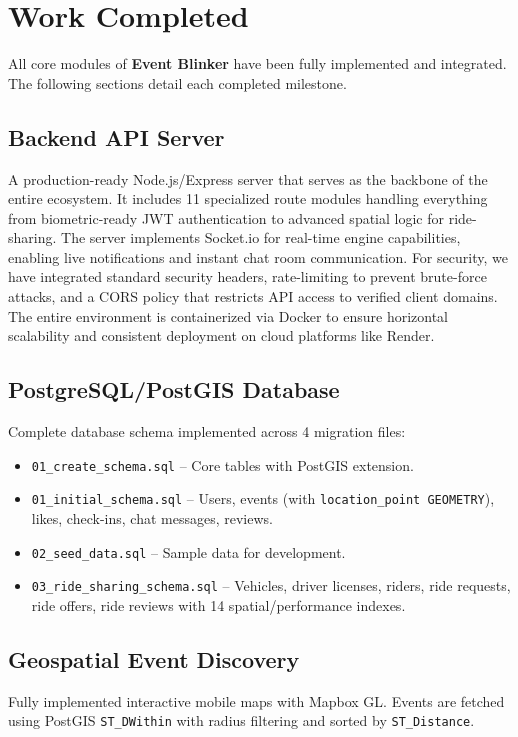 \chapter{Work Completed}

All core modules of \textbf{Event Blinker} have been fully implemented and integrated. The following sections detail each completed milestone.

\section{Backend API Server}
A production-ready Node.js/Express server that serves as the backbone of the entire ecosystem. It includes 11 specialized route modules handling everything from biometric-ready JWT authentication to advanced spatial logic for ride-sharing. The server implements Socket.io for real-time engine capabilities, enabling live notifications and instant chat room communication. For security, we have integrated standard security headers, rate-limiting to prevent brute-force attacks, and a CORS policy that restricts API access to verified client domains. The entire environment is containerized via Docker to ensure horizontal scalability and consistent deployment on cloud platforms like Render.

\section{PostgreSQL/PostGIS Database}
Complete database schema implemented across 4 migration files:
\begin{itemize}[noitemsep]
    \item \texttt{01\_create\_schema.sql} -- Core tables with PostGIS extension.
    \item \texttt{01\_initial\_schema.sql} -- Users, events (with \texttt{location\_point GEOMETRY}), likes, check-ins, chat messages, reviews.
    \item \texttt{02\_seed\_data.sql} -- Sample data for development.
    \item \texttt{03\_ride\_sharing\_schema.sql} -- Vehicles, driver licenses, riders, ride requests, ride offers, ride reviews with 14 spatial/performance indexes.
\end{itemize}

\section{Geospatial Event Discovery}
Fully implemented interactive mobile maps with Mapbox GL. Events are fetched using PostGIS \texttt{ST\_DWithin} with radius filtering and sorted by \texttt{ST\_Distance}.

